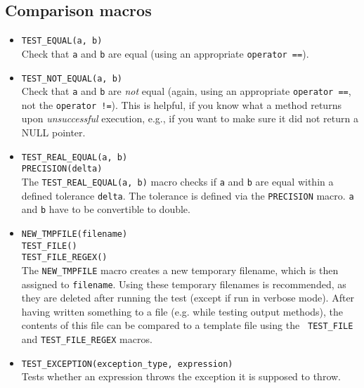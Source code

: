 \documentclass[a4paper,10pt]{article}
\begin{document}
\subsection{Comparison macros}
\begin{itemize}
	\item {\tt TEST\_EQUAL(a, b)}\\
		Check that {\tt a} and {\tt b} are equal (using an appropriate {\tt operator ==}).

	\item {\tt TEST\_NOT\_EQUAL(a, b)}\\
		Check that {\tt a} and {\tt b} are \emph{not} equal (again, using an
		appropriate {\tt operator ==}, not the {\tt operator !=}). This is helpful, if
		you know what a method returns upon \emph{unsuccessful} execution, e.g.,
		if you want to make sure it did not return a NULL pointer.

	\item {\tt TEST\_REAL\_EQUAL(a, b)}\\
	{\tt PRECISION(delta)}\\
		The {\tt TEST\_REAL\_EQUAL(a, b)} macro checks if {\tt a} and {\tt b} 
    are equal within a defined tolerance {\tt delta}. 
    The tolerance is defined via the {\tt PRECISION} macro. 
    {\tt a} and {\tt b} have to be convertible to double. 

	\item{\tt NEW\_TMPFILE(filename)}\\
	{\tt TEST\_FILE()}\\
	{\tt TEST\_FILE\_REGEX()}\\
		The {\tt NEW\_TMPFILE} macro creates a new temporary filename, which is then assigned
		to {\tt filename}. Using these temporary filenames is recommended, as they
		are deleted after running the test (except if run in verbose mode).
		After having written something to a file (e.g. while testing output methods), the
		contents of this file can be compared to a template file using the {\tt
		TEST\_FILE} and {\tt TEST\_FILE\_REGEX} macros.

	\item {\tt TEST\_EXCEPTION(exception\_type, expression)}\\
		Tests whether an expression throws the exception it is supposed to throw.
	
	
\end{itemize}
\end{document}
